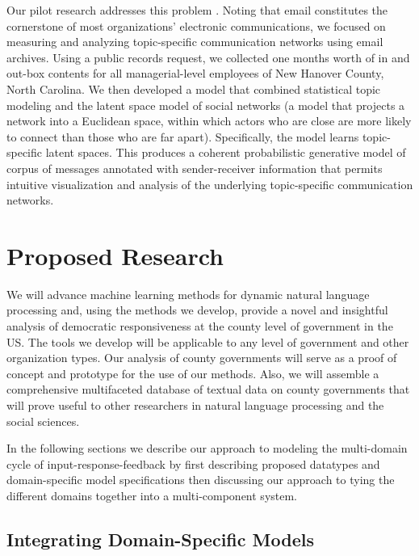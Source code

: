 Our pilot research addresses this problem \cite{Krafft2012}. Noting that email constitutes the cornerstone of most organizations' electronic communications, we focused on measuring and analyzing topic-specific communication networks using email archives. Using a public records request, we collected one months worth of in and out-box contents for all managerial-level employees of New Hanover County, North Carolina. We then developed a model that combined statistical topic modeling and the latent space model of social networks (a model that projects a network into a Euclidean space, within which actors who are close are more likely to connect than those who are far apart). Specifically, the model learns topic-specific latent spaces. This produces a coherent probabilistic generative model of corpus of messages annotated with sender-receiver information that permits intuitive visualization and analysis of the underlying topic-specific communication networks.

\section{Proposed Research}

We will advance machine learning methods for dynamic natural language processing and, using the methods we develop, provide a novel and insightful analysis of democratic responsiveness at the county level of government in the US. The tools we develop will be applicable to any level of government and other organization types. Our analysis of county governments will serve as a proof of concept and prototype for the use of our methods. Also, we will assemble a comprehensive multifaceted database of textual data on county governments that will prove useful to other researchers in natural language processing and the social sciences.

In the following sections we describe our approach to modeling the multi-domain cycle of input-response-feedback by first describing proposed datatypes and domain-specific model specifications then discussing our approach to tying the different domains together into a multi-component system.

\subsection{Integrating Domain-Specific Models}

